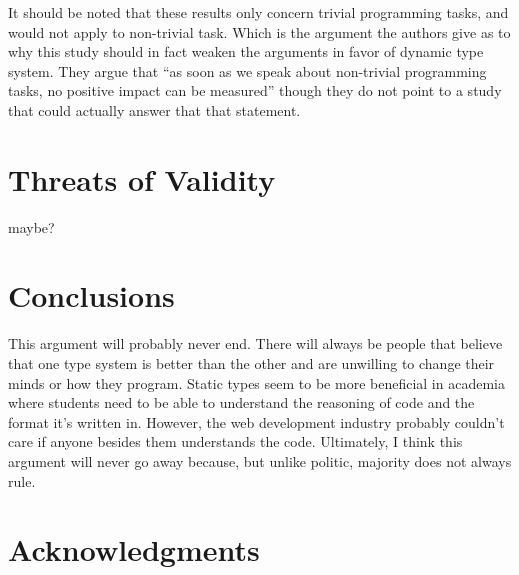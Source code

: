\documentclass{sig-alternate}
\begin{document}
It should be noted that these results only concern trivial programming tasks, and would not apply to non-trivial task. Which is the argument the authors give as to why this study should in fact weaken the arguments in favor of dynamic type system. They argue that ``as soon as we speak about non-trivial programming tasks, no positive impact can be measured'' though they do not point to a study that could actually answer that that statement.

\section{Threats of Validity}
maybe?

\section{Conclusions}\label{results}
This argument will probably never end. There will always be people that believe that one type system is better than the other and are unwilling to change their minds or how they program. Static types seem to be more beneficial in academia where students need to be able to understand the reasoning of code and the format it's written in. However, the web development industry probably couldn't care if anyone besides them understands the code. Ultimately, I think this argument will never go away because, but unlike politic, majority does not always rule.

\section{Acknowledgments}




\end{document}
